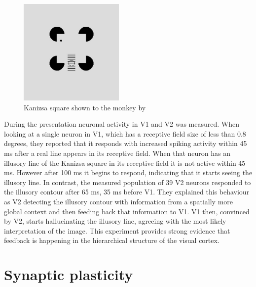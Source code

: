 \begin{figure}
  \includegraphics[width=\linewidth]{figures/kanizsaSquare.PNG}
  \caption{Kanizsa square shown to the monkey by \citet{HierachicalBayesVisualCortex}}
  \label{fig:KanizsaSquare}
\end{figure}
During the presentation neuronal activity in V1 and V2 was measured. When looking at a single neuron in V1, which has a receptive field size of less than 0.8 degrees, they reported that it responds with increased spiking activity within 45 ms after a real line appears in its receptive field. When that neuron has an illusory line of the Kanizsa square in its receptive field it is not active within 45 ms. However after 100 ms it begins to respond, indicating that it starts seeing the illusory line. In contrast, the measured population of 39 V2 neurons responded to the illusory contour after 65 ms, 35 ms before V1. They explained this behaviour as V2 detecting the illusory contour with information from a spatially more global context and then feeding back that information to V1. V1 then, convinced by V2, starts hallucinating the illusory line, agreeing with the most likely interpretation of the image. This experiment provides strong evidence that feedback is happening in the hierarchical structure of the visual cortex.

\section{Synaptic plasticity}

